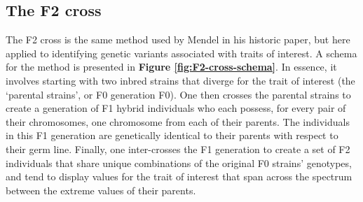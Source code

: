 \documentclass[
]{book}
\begin{document}
\hypertarget{the-f2-cross}{%
\subsection{The F2 cross}\label{the-f2-cross}}

The F2 cross is the same method used by Mendel in his historic paper, but here applied to identifying genetic variants associated with traits of interest. A schema for the method is presented in \textbf{Figure \ref{fig:F2-cross-schema}}. In essence, it involves starting with two inbred strains that diverge for the trait of interest (the `parental strains', or F0 generation F0). One then crosses the parental strains to create a generation of F1 hybrid individuals who each possess, for every pair of their chromosomes, one chromosome from each of their parents. The individuals in this F1 generation are genetically identical to their parents with respect to their germ line. Finally, one inter-crosses the F1 generation to create a set of F2 individuals that share unique combinations of the original F0 strains' genotypes, and tend to display values for the trait of interest that span across the spectrum between the extreme values of their parents.
\end{document}
